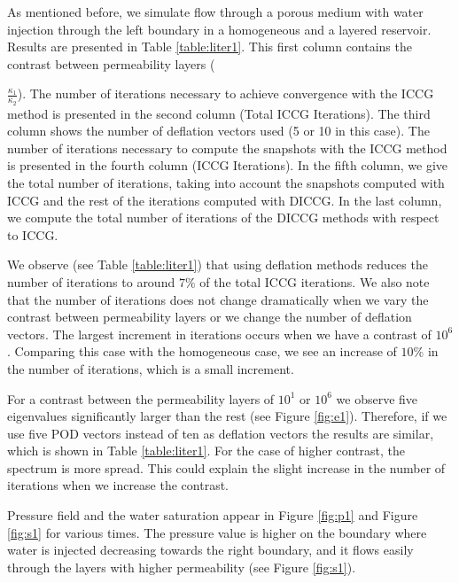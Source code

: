 \documentclass[12pt]{article}
\begin{document}
\hspace{0.5cm}As mentioned before, we simulate flow through a porous medium with water injection through the left boundary in a homogeneous and a layered reservoir. Results are presented in Table \ref{table:liter1}. This first column contains the contrast between permeability layers ({$\frac{\kappa_1}{\kappa_2}$). The number of iterations necessary to achieve convergence with the ICCG method is presented in the second column (Total ICCG Iterations). The third column shows the number of deflation vectors used (5 or 10 in this case). The number of iterations necessary to compute the snapshots with the ICCG method is presented in the fourth column (ICCG Iterations). In the fifth column, we give the total number of iterations, taking into account the snapshots computed with ICCG and the rest of the iterations computed with DICCG. In the last column, we compute the total number of iterations of the DICCG methods with respect to ICCG.\par
We observe (see Table \ref{table:liter1}) that using deflation methods reduces the number of iterations to around $7\%$ of the total ICCG iterations. We also note that the number of iterations does not change dramatically when we vary the contrast between permeability layers or we change the number of deflation vectors. The largest increment in iterations occurs when we have a contrast of $10^ 6$. Comparing this case with the homogeneous case, we see an increase of $10\%$ in the number of iterations, which is a small increment. \par
For a contrast between the permeability layers of $10^1$ or $10^6$ we observe five eigenvalues significantly larger than the rest (see Figure \ref{fig:e1}). Therefore, if we use five POD vectors instead of ten as deflation vectors the results are similar, which is shown in Table \ref{table:liter1}. For the case of higher contrast, the spectrum is more spread. This could explain the slight increase in the number of iterations when we increase the contrast. \par
Pressure field and the water saturation appear in Figure \ref{fig:p1} and Figure \ref{fig:s1} for various times. The pressure value is higher on the boundary where water is injected decreasing towards the right boundary, and it flows easily through the layers with higher permeability (see Figure \ref{fig:s1}).

}
\end{document}
